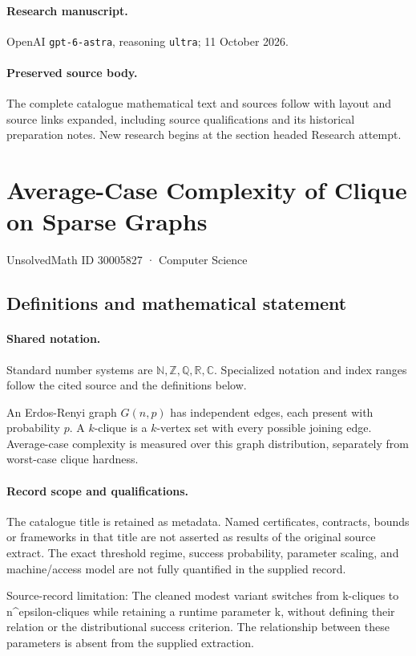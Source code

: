 \documentclass[11pt]{article}
\begin{document}
\paragraph{Research manuscript.} OpenAI \texttt{gpt-6-astra}, reasoning \texttt{ultra}; 11 October 2026.
\paragraph{Preserved source body.} The complete catalogue mathematical text and sources follow with layout and source links expanded, including source qualifications and its historical preparation notes. New research begins at the section headed Research attempt.

\section{Average-Case Complexity of Clique on Sparse Graphs}\label{30005827}
{\small UnsolvedMath ID 30005827 · Computer Science}
\subsection{Definitions and mathematical statement}

\paragraph{Shared notation.}Standard number systems are $\mathbb N,\mathbb Z,\mathbb Q,\mathbb R,\mathbb C$. Specialized notation and index ranges follow the cited source and the definitions below.


An Erdos-Renyi graph $G(n,p)$ has independent edges, each present with probability $p$. A $k$-clique is a $k$-vertex set with every possible joining edge. Average-case complexity is measured over this graph distribution, separately from worst-case clique hardness.
\paragraph{Record scope and qualifications.}
The catalogue title is retained as metadata. Named certificates, contracts, bounds or frameworks in that title are not asserted as results of the original source extract.
The exact threshold regime, success probability, parameter scaling, and machine/access model are not fully quantified in the supplied record.

Source-record limitation: The cleaned modest variant switches from k-cliques to n^epsilon-cliques while retaining a runtime parameter k, without defining their relation or the distributional success criterion. The relationship between these parameters is absent from the supplied extraction.
\end{document}
